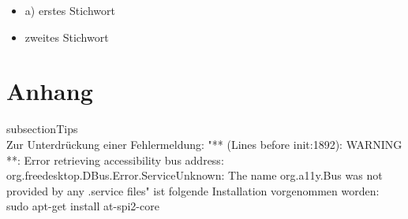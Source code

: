 \documentclass[a4paper,10pt]{article}
\begin{document}
  \begin{itemize}
  \item{a)} erstes Stichwort
  \item zweites Stichwort
  \end{itemize}

  \section{Anhang}
    subsection{Tips} \\
    Zur Unterdrückung einer Fehlermeldung:
    "** (Lines before init:1892): WARNING **: Error retrieving accessibility bus
    address: org.freedesktop.DBus.Error.ServiceUnknown: The name org.a11y.Bus
    was not provided by any .service files"
    ist folgende Installation vorgenommen worden:
    sudo apt-get install at-spi2-core

	
  
\end{document}
